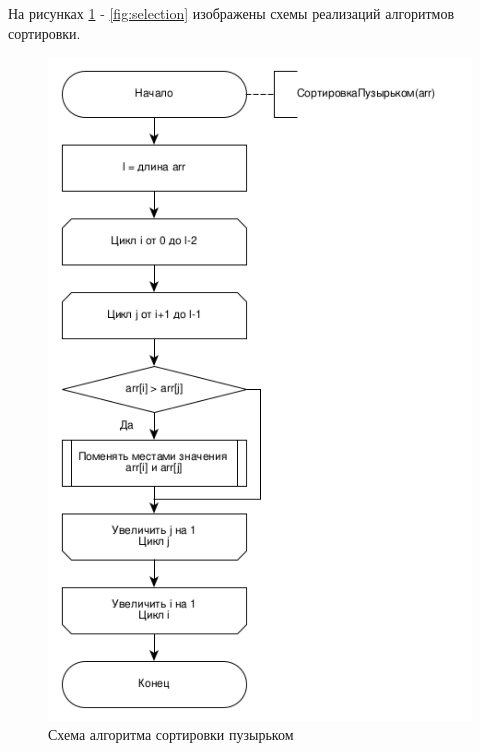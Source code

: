 \documentclass[14pt,russian]{scrartcl}
\begin{document}
На рисунках \ref{fig:bubble} - \ref{fig:selection} изображены схемы реализаций алгоритмов сортировки.

\begin{figure}[h]
	\centering
	\includegraphics[scale=1]{bubble.png}
	\caption{Схема алгоритма сортировки пузырьком}
	\label{fig:bubble}
\end{figure}
\end{document}

